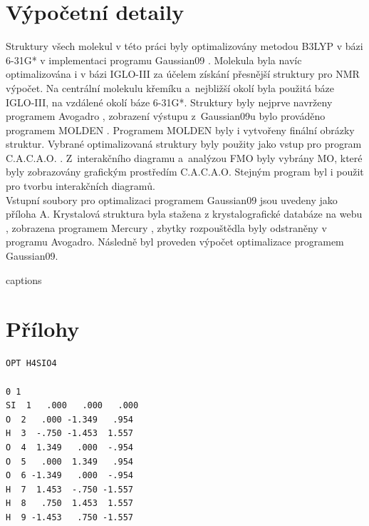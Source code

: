 \documentclass[
  printed, %
  table,   %
  lof,     %
  lot,     %
  oneside,
]{fithesis3}
\begin{document}
  \chapter{Výpočetní detaily}
  Struktury všech molekul v této práci byly optimalizovány metodou B3LYP v bázi 6-31G* v implementaci programu Gaussian09 \cite{g09}. Molekula  byla navíc optimalizována i v bázi IGLO-III \cite{EMSL} za účelem získání přesnější struktury pro NMR výpočet. Na centrální molekulu křemíku a~nejbližší okolí byla použitá báze IGLO-III, na vzdálené okolí báze 6-31G*. Struktury byly nejprve navrženy programem Avogadro \cite{Avogadro}, zobrazení výstupu z~Gaussian09u bylo prováděno programem MOLDEN \cite{Molden}. Programem MOLDEN byly i vytvořeny finální obrázky struktur. Vybrané optimalizovaná struktury byly použity jako vstup pro program C.A.C.A.O. \cite{cacao}. Z~interakčního diagramu a~analýzou FMO byly vybrány MO, které byly zobrazovány grafickým prostředím C.A.C.A.O. Stejným program byl i použit pro tvorbu interakčních diagramů. \\
Vstupní soubory pro optimalizaci programem Gaussian09 jsou uvedeny jako příloha A. Krystalová struktura  byla stažena z krystalografické databáze na webu \cite{CCDC}, zobrazena programem Mercury \cite{Mercury}, zbytky rozpouštědla byly odstraněny v programu Avogadro. Následně byl proveden výpočet optimalizace programem Gaussian09.



  
{\csname captions\languagename\endcsname %
\makeatletter %
  \thesis@selectLocale{\thesis@locale}\makeatother
\printbibliography[heading=bibintoc]} %
\appendix %


\chapter{Přílohy}
 \begin{lstlisting}[frame=single, caption={\ce{H4SiO4} },label=DescriptiveLabel]
OPT H4SIO4 

0 1
SI  1   .000   .000   .000 
O  2   .000 -1.349   .954 
H  3  -.750 -1.453  1.557 
O  4  1.349   .000  -.954 
O  5   .000  1.349   .954 
O  6 -1.349   .000  -.954 
H  7  1.453  -.750 -1.557 
H  8   .750  1.453  1.557 
H  9 -1.453   .750 -1.557 
 \end{lstlisting}
\end{document}
